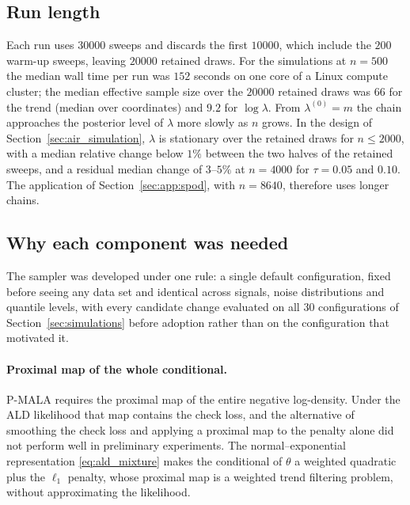 \subsection{Run length}
\label{app:pmala:runlength}

Each run uses $30000$ sweeps and discards the first $10000$, which include the $200$ warm-up sweeps, leaving $20000$ retained draws. For the simulations at $n = 500$ the median wall time per run was $152$ seconds on one core of a Linux compute cluster; the median effective sample size over the $20000$ retained draws was $66$ for the trend (median over coordinates) and $9.2$ for $\log\lambda$. From $\lambda^{(0)} = m$ the chain approaches the posterior level of $\lambda$ more slowly as $n$ grows. In the design of Section~\ref{sec:air_simulation}, $\lambda$ is stationary over the retained draws for $n \le 2000$, with a median relative change below $1\%$ between the two halves of the retained sweeps, and a residual median change of $3$--$5\%$ at $n = 4000$ for $\tau = 0.05$ and $0.10$. The application of Section~\ref{sec:app:spod}, with $n = 8640$, therefore uses longer chains.

\subsection{Why each component was needed}
\label{app:pmala:changes}

The sampler was developed under one rule: a single default configuration, fixed before seeing any data set and identical across signals, noise distributions and quantile levels, with every candidate change evaluated on all $30$ configurations of Section~\ref{sec:simulations} before adoption rather than on the configuration that motivated it.

\paragraph{Proximal map of the whole conditional.} P-MALA requires the proximal map of the entire negative log-density. Under the ALD likelihood that map contains the check loss, and the alternative of smoothing the check loss and applying a proximal map to the penalty alone did not perform well in preliminary experiments. The normal--exponential representation \eqref{eq:ald_mixture} makes the conditional of $\theta$ a weighted quadratic plus the $\ell_1$ penalty, whose proximal map is a weighted trend filtering problem, without approximating the likelihood.

